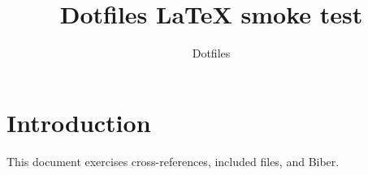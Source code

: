 \documentclass{article}
\title{Dotfiles LaTeX smoke test}
\author{Dotfiles}
\begin{document}
\maketitle

\section{Introduction}
\label{sec:introduction}

This document exercises cross-references, included files, and Biber.



\printbibliography
\end{document}
